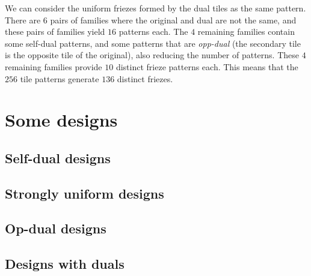 \documentclass{tufte-book}
\begin{document}
\vspace{0.5cm}
\noindent
We can consider the uniform friezes formed by the dual tiles as the same pattern. There are $6$ pairs of families where the original and dual are not the same, and these pairs of families yield $16$ patterns each. The $4$ remaining families contain some self-dual patterns, and some patterns that are \textit{opp-dual} (the secondary tile is the opposite tile of the original), also reducing the number of patterns. These $4$ remaining families provide $10$ distinct frieze patterns each. This means that the $256$ tile patterns generate $136$ distinct friezes. 

\vspace{0.5cm}
\noindent

\noindent
\newpage



\chapter{Some designs}

\section{Self-dual designs}
{
\setlength{\tabcolsep}{0pt}
\renewcommand{\arraystretch}{0}

}

\section{Strongly uniform designs}
{
\setlength{\tabcolsep}{0pt}
\renewcommand{\arraystretch}{0}

}

\section{Op-dual designs}
{
\setlength{\tabcolsep}{0pt}
\renewcommand{\arraystretch}{0}

}

\section{Designs with duals}
{
\setlength{\tabcolsep}{0pt}
\renewcommand{\arraystretch}{0}

}


\backmatter
\nocite{*}


\end{document}
